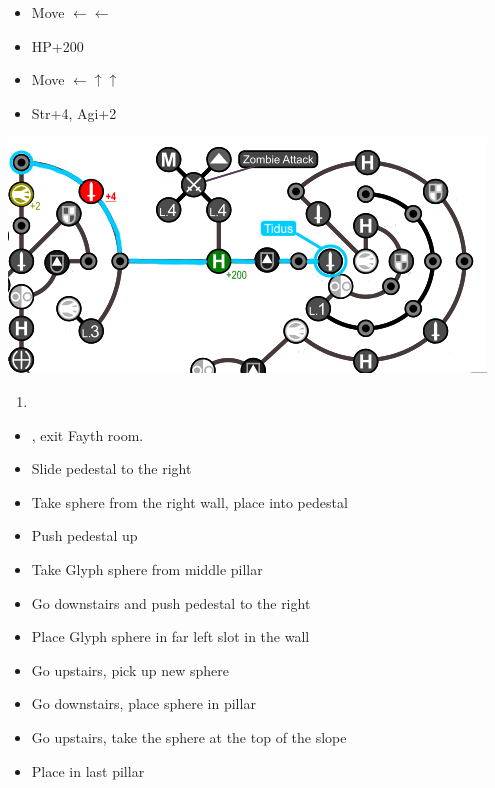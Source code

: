 \begin{spheregrid}
	\begin{itemize}
		\tidusf
		\begin{itemize}
			\item Move $\leftarrow\leftarrow$
			\item HP+200
			\item Move $\leftarrow\uparrow\uparrow$
			\item Str+4, Agi+2
		\end{itemize}
		\includegraphics[width=.8\columnwidth]{graphics/Tidus_Post_Seymour}
	\end{itemize}
\end{spheregrid}
\begin{enumerate}[resume]
	\item \formation{\rikku}{\tidus}{\yuna}
\end{enumerate}
\begin{trial}
	\begin{itemize}
	  \item \save, exit Fayth room.
	  \item Slide pedestal to the right
        \item Take sphere from the right wall, place into pedestal
        \item Push pedestal up
        \item Take Glyph sphere from middle pillar
        \item Go downstairs and push pedestal to the right
        \item Place Glyph sphere in far left slot in the wall
        \item Go upstairs, pick up new sphere
        \item Go downstairs, place sphere in pillar
        \item Go upstairs, take the sphere at the top of the slope
        \item Place in last pillar
	\end{itemize}
\end{trial}
